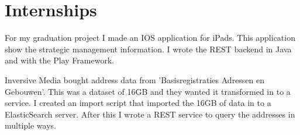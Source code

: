 \documentclass[]{deedy-resume-openfont}
\begin{document}
\begin{minipage}[t]{0.66\textwidth}

\section{Internships}
For my graduation project I made an IOS application for iPads. 
This application show the strategic management information. 
I wrote the REST backend in Java and with the Play Framework.
\sectionsep

Inversive Media bought address data from 'Basisregistraties Adressen en Gebouwen'.
This was a dataset of 16GB and they wanted it transformed in to a service.
I created an import script that imported the 16GB of data in to a ElasticSearch server.
After this I wrote a REST service to query the addresses in multiple ways.
\sectionsep


\end{minipage} 
\end{document}
